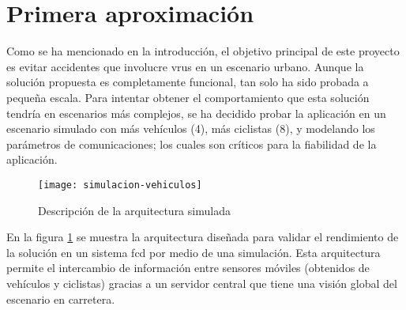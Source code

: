 \section{Primera aproximación}
Como se ha mencionado en la introducción, el objetivo principal de este proyecto es evitar accidentes que involucre \gls{vru}s en un escenario urbano. Aunque la solución propuesta es completamente funcional, tan solo ha sido probada a pequeña escala. Para intentar obtener el comportamiento que esta solución tendría en escenarios más complejos, se ha decidido probar la aplicación en un escenario simulado con más vehículos (4), más ciclistas (8), y modelando los parámetros de comunicaciones; los cuales son críticos para la fiabilidad de la aplicación.
\begin{figure}[t]
	\texttt{[image: simulacion-vehiculos]}
	\caption{Descripción de la arquitectura simulada}
	\label{fig:simulacion-vehiculos}
\end{figure}
En la figura \ref{fig:simulacion-vehiculos} se muestra la arquitectura diseñada para validar el rendimiento de la solución en un sistema \gls{fcd} por medio de una simulación. Esta arquitectura permite el intercambio de información entre sensores móviles (obtenidos de vehículos y ciclistas) gracias a un servidor central que tiene una visión global del escenario en carretera.

